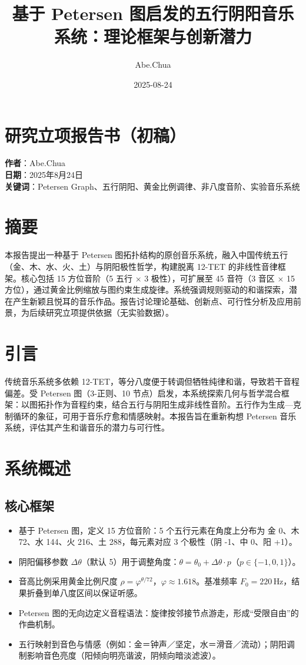 \documentclass{article}
\title{基于 Petersen 图启发的五行阴阳音乐系统：理论框架与创新潜力}
\author{Abe.Chua}
\date{2025-08-24}
\begin{document}
\maketitle

\section*{研究立项报告书（初稿）}
\textbf{作者}：Abe.Chua \\
\textbf{日期}：2025年8月24日 \\
\textbf{关键词}：Petersen Graph、五行阴阳、黄金比例调律、非八度音阶、实验音乐系统

\section{摘要}
本报告提出一种基于 Petersen 图拓扑结构的原创音乐系统，融入中国传统五行（金、木、水、火、土）与阴阳极性哲学，构建脱离 12-TET 的非线性音律框架。核心包括 15 方位音阶（5 五行 × 3 极性），可扩展至 45 音符（3 音区 × 15 方位），通过黄金比例缩放与图约束生成旋律。系统强调规则驱动的和谐探索，潜在产生新颖且悦耳的音乐作品。报告讨论理论基础、创新点、可行性分析及应用前景，为后续研究立项提供依据（无实验数据）。

\section{引言}
传统音乐系统多依赖 12-TET，等分八度便于转调但牺牲纯律和谐，导致若干音程偏差。受 Petersen 图（3-正则、10 节点）启发，本系统探索几何与哲学混合框架：以图拓扑作为音程约束，结合五行与阴阳生成非线性音阶。五行作为生成—克制循环的象征，可用于音乐疗愈和情感映射。本报告旨在重新构想 Petersen 音乐系统，评估其产生和谐音乐的潜力与可行性。

\section{系统概述}
\subsection{核心框架}
\begin{itemize}
  \item 基于 Petersen 图，定义 15 方位音阶：5 个五行元素在角度上分布为 金 0\textdegree、木 72\textdegree、水 144\textdegree、火 216\textdegree、土 288\textdegree，每元素对应 3 个极性（阴 -1、中 0、阳 +1）。
  \item 阴阳偏移参数 $\Delta\theta$（默认 5\textdegree）用于调整角度：$\theta=\theta_0+\Delta\theta\cdot p$（$p\in\{-1,0,1\}$）。
  \item 音高比例采用黄金比例尺度 $\rho=\varphi^{\theta/72}$，$\varphi\approx1.618$。基准频率 $F_0=220\,$Hz，结果折叠到单八度区间以保证听感。
  \item Petersen 图的无向边定义音程语法：旋律按邻接节点游走，形成“受限自由”的作曲机制。
  \item 五行映射到音色与情感（例如：金＝钟声／坚定，水＝滑音／流动）；阴阳调制影响音色亮度（阳倾向明亮谐波，阴倾向暗淡滤波）。
\end{itemize}
\end{document}
